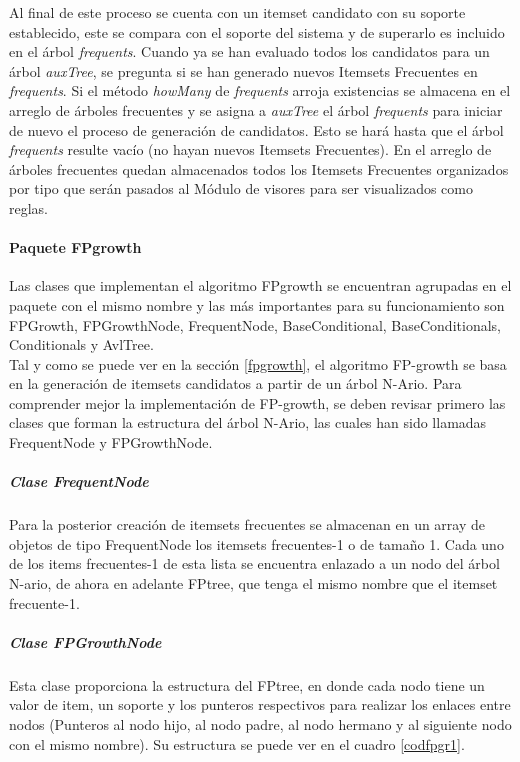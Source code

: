Al final de este proceso se cuenta con un itemset candidato con su soporte establecido, este se compara con el
soporte del sistema y de superarlo es incluido en el \'arbol \textit{frequents}.  Cuando ya se han evaluado todos
los candidatos para un \'arbol \textit{auxTree}, se pregunta si se han generado nuevos Itemsets Frecuentes en
\textit{frequents}.  Si el m\'etodo \textit{howMany} de \textit{frequents} arroja existencias se almacena en el
arreglo de  \'arboles frecuentes y se asigna a \textit{auxTree} el \'arbol \textit{frequents} para iniciar de 
nuevo el proceso de generaci\'on de candidatos.  Esto se har\'a hasta que el \'arbol \textit{frequents} resulte
vac\'io (no hayan nuevos Itemsets Frecuentes).  En el arreglo de \'arboles frecuentes quedan almacenados todos
los Itemsets Frecuentes organizados por tipo que ser\'an pasados al M\'odulo de visores para ser visualizados
como reglas.
\paragraph{Paquete FPgrowth}
Las clases que implementan el algoritmo FPgrowth se encuentran agrupadas en el paquete con el mismo nombre y las
m\'as importantes para su funcionamiento son FPGrowth, FPGrowthNode, FrequentNode, BaseConditional, 
BaseConditionals, Conditionals y AvlTree.\\

Tal y como se puede ver en la secci\'on \ref{fpgrowth}, el algoritmo FP-growth se basa en la generaci\'on de
itemsets candidatos a partir de un \'arbol N-Ario. Para comprender mejor la implementaci\'on de FP-growth, se
deben revisar primero las clases que forman la estructura del \'arbol N-Ario, las cuales han sido llamadas
FrequentNode y FPGrowthNode.

\subparagraph{Clase FrequentNode}
Para la posterior creaci\'on de itemsets frecuentes se almacenan en un array de objetos de tipo FrequentNode los
itemsets frecuentes-1 o de tama\~no 1. Cada uno de los items frecuentes-1 de esta lista se encuentra enlazado a
un nodo del \'arbol N-ario, de ahora en adelante FPtree, que tenga el mismo nombre que el itemset frecuente-1.

\subparagraph{Clase FPGrowthNode}
Esta clase proporciona la estructura del FPtree, en donde cada nodo tiene un valor de item, un soporte y los
punteros respectivos para realizar los enlaces entre nodos (Punteros al nodo hijo, al nodo padre, al nodo
hermano y al siguiente nodo con el mismo nombre). Su estructura se puede ver en el cuadro \ref{codfpgr1}.\\

